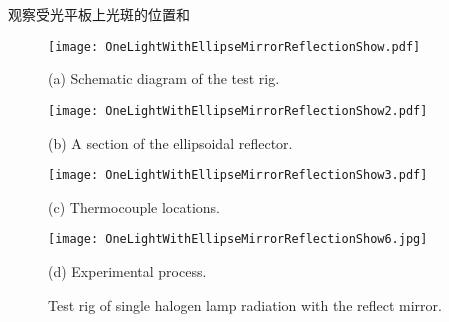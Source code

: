 观察受光平板上光斑的位置和
\begin{figure}
  \begin{minipage}[t]{0.5\linewidth} %
  \nonumber
    \centering
    \texttt{[image: OneLightWithEllipseMirrorReflectionShow.pdf]}
    \centerline{(a) Schematic diagram of the test rig.}
    \label{Fig:OneLightWithEllipseMirrorReflectionShow}
  \end{minipage}%
  \begin{minipage}[t]{0.5\linewidth}
    \centering
    \texttt{[image: OneLightWithEllipseMirrorReflectionShow2.pdf]}
    \centerline{(b) A section of the ellipsoidal reflector.}
    \label{Fig:OneLightWithEllipseMirrorReflectionShow2}
  \end{minipage}

  \begin{minipage}[t]{0.5\linewidth} %
  \nonumber
    \centering
    \texttt{[image: OneLightWithEllipseMirrorReflectionShow3.pdf]}
    \centerline{(c) Thermocouple locations.}
    \label{Fig:OneLightWithEllipseMirrorReflectionShow3}
  \end{minipage}%
  \begin{minipage}[t]{0.5\linewidth}
    \centering
    \texttt{[image: OneLightWithEllipseMirrorReflectionShow6.jpg]}
    \centerline{(d) Experimental process.}
    \label{Fig:OneLightWithEllipseMirrorReflectionShow6}
  \end{minipage}


  \caption{Test rig of single halogen lamp radiation with the reflect mirror.}
  \label{Fig:OneLightWithEllipseMirrorReflectionShow}
\end{figure}

